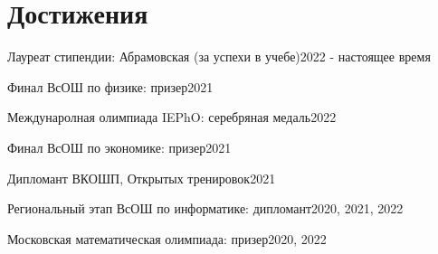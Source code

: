 \section{\textbf{Достижения}}
\resumeSubHeadingListStart

\resumePOR
{Лауреат стипендии: }{Абрамовская (за успехи в учебе)}{2022 - настоящее время}

\resumePOR
{Финал ВсОШ по физике: }{призер}{2021}

\resumePOR
{Междунаролная олимпиада IEPhO: }{серебряная медаль}{2022}

\resumePOR
{Финал ВсОШ по экономике: }{призер}{2021}

\resumePOR
{Дипломант ВКОШП, Открытых тренировок}{}{2021}

\resumePOR
{Региональный этап ВсОШ по информатике: }{дипломант}{2020, 2021, 2022}

\resumePOR
{Московская математическая олимпиада: }{призер}{2020, 2022}

\resumeSubHeadingListEnd
